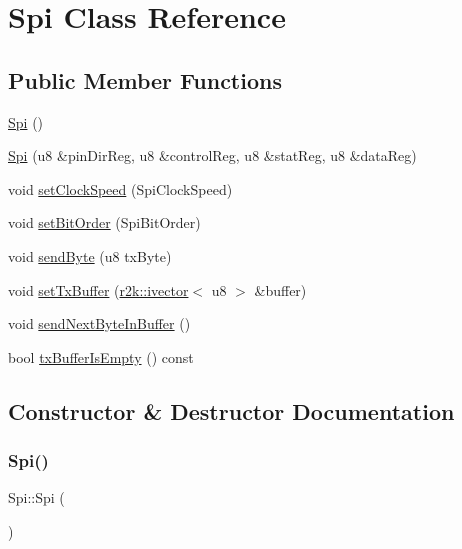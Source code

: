 \hypertarget{class_spi}{}\section{Spi Class Reference}
\label{class_spi}
\subsection*{Public Member Functions}
\begin{DoxyCompactItemize}
\item 
\mbox{\hyperlink{class_spi_a27b7b236f911650839cf9465bfc4b972}{Spi}} ()
\item 
\mbox{\hyperlink{class_spi_aa5bff4855080ca494dda262669931973}{Spi}} (u8 \&pin\+Dir\+Reg, u8 \&control\+Reg, u8 \&stat\+Reg, u8 \&data\+Reg)
\item 
void \mbox{\hyperlink{class_spi_af36b174c9f4ab3dcd3d1b24587d396c8}{set\+Clock\+Speed}} (Spi\+Clock\+Speed)
\item 
void \mbox{\hyperlink{class_spi_aee3ca300877494f2c66be7c99d831ee1}{set\+Bit\+Order}} (Spi\+Bit\+Order)
\item 
void \mbox{\hyperlink{class_spi_af95597dbf2ad61755808ea6d87e587f1}{send\+Byte}} (u8 tx\+Byte)
\item 
void \mbox{\hyperlink{class_spi_a11ab7b1a91e22d08a43ae08d94ca447d}{set\+Tx\+Buffer}} (\mbox{\hyperlink{classr2k_1_1ivector}{r2k\+::ivector}}$<$ u8 $>$ \&buffer)
\item 
void \mbox{\hyperlink{class_spi_ad356e46ffdf7cc7d674eb871f05e8b0d}{send\+Next\+Byte\+In\+Buffer}} ()
\item 
bool \mbox{\hyperlink{class_spi_a8cf0289f4aaa9298b479a48de1dd6cb8}{tx\+Buffer\+Is\+Empty}} () const
\end{DoxyCompactItemize}


\subsection{Constructor \& Destructor Documentation}
\mbox{\label{class_spi_a27b7b236f911650839cf9465bfc4b972}} 
\subsubsection{\texorpdfstring{Spi()}{Spi()}\hspace{0.1cm}{\footnotesize\ttfamily [1/2]}}
{\footnotesize\ttfamily Spi\+::\+Spi (\begin{DoxyParamCaption}{ }\end{DoxyParamCaption})}

